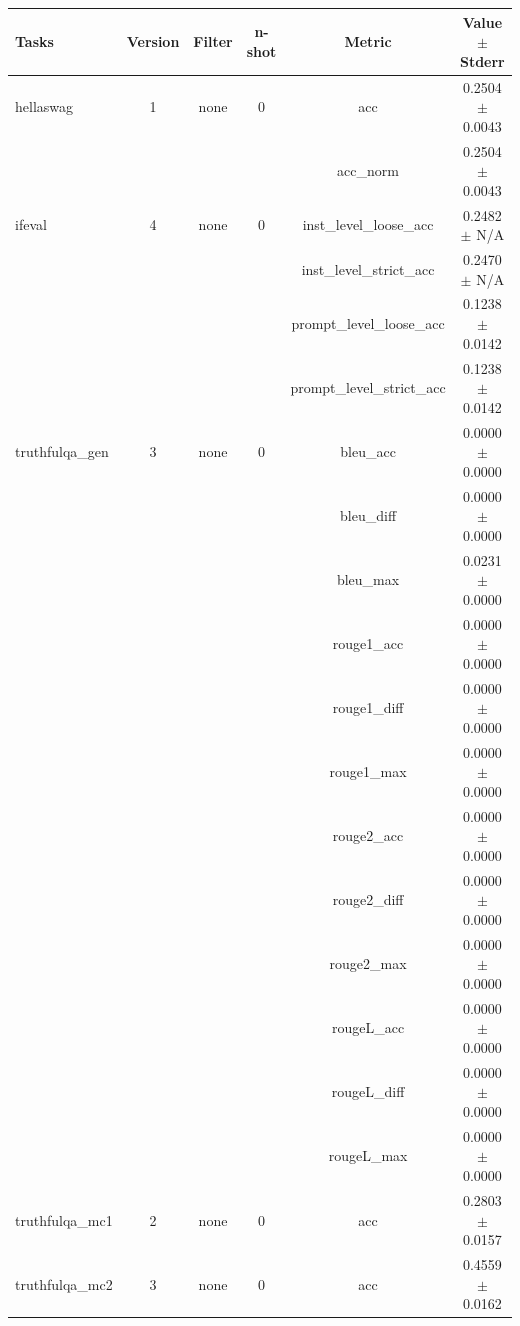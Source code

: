 \documentclass{ifacconf}
\begin{document}
	\vfill
	\clearpage
	\pagebreak
	
	\begin{strip}
		\begin{minipage}{\textwidth}
			\begin{table}[H]
				\centering
				\begin{tabular}{|l|c|c|c|c|c|}
					\hline
					\textbf{Tasks} & \textbf{Version} & \textbf{Filter} & \textbf{n-shot} & \textbf{Metric} & \textbf{Value} $\pm$ \textbf{Stderr} \\ \hline
					hellaswag & 1 & none & 0 & acc & 0.2504 $\pm$ 0.0043 \\ \hline
					& & & & acc\_norm & 0.2504 $\pm$ 0.0043 \\ \hline
					ifeval & 4 & none & 0 & inst\_level\_loose\_acc & 0.2482 $\pm$ N/A \\ \hline
					& & & & inst\_level\_strict\_acc & 0.2470 $\pm$ N/A \\ \hline
					& & & & prompt\_level\_loose\_acc & 0.1238 $\pm$ 0.0142 \\ \hline
					& & & & prompt\_level\_strict\_acc & 0.1238 $\pm$ 0.0142 \\ \hline
					truthfulqa\_gen & 3 & none & 0 & bleu\_acc & 0.0000 $\pm$ 0.0000 \\ \hline
					& & & & bleu\_diff & 0.0000 $\pm$ 0.0000 \\ \hline
					& & & & bleu\_max & 0.0231 $\pm$ 0.0000 \\ \hline
					& & & & rouge1\_acc & 0.0000 $\pm$ 0.0000 \\ \hline
					& & & & rouge1\_diff & 0.0000 $\pm$ 0.0000 \\ \hline
					& & & & rouge1\_max & 0.0000 $\pm$ 0.0000 \\ \hline
					& & & & rouge2\_acc & 0.0000 $\pm$ 0.0000 \\ \hline
					& & & & rouge2\_diff & 0.0000 $\pm$ 0.0000 \\ \hline
					& & & & rouge2\_max & 0.0000 $\pm$ 0.0000 \\ \hline
					& & & & rougeL\_acc & 0.0000 $\pm$ 0.0000 \\ \hline
					& & & & rougeL\_diff & 0.0000 $\pm$ 0.0000 \\ \hline
					& & & & rougeL\_max & 0.0000 $\pm$ 0.0000 \\ \hline
					truthfulqa\_mc1 & 2 & none & 0 & acc & 0.2803 $\pm$ 0.0157 \\ \hline
					truthfulqa\_mc2 & 3 & none & 0 & acc & 0.4559 $\pm$ 0.0162 \\ \hline
				\end{tabular}
				\label{tab:gemma2_q4km}
			\end{table}
			

\end{minipage}
\end{strip}
\end{document}
